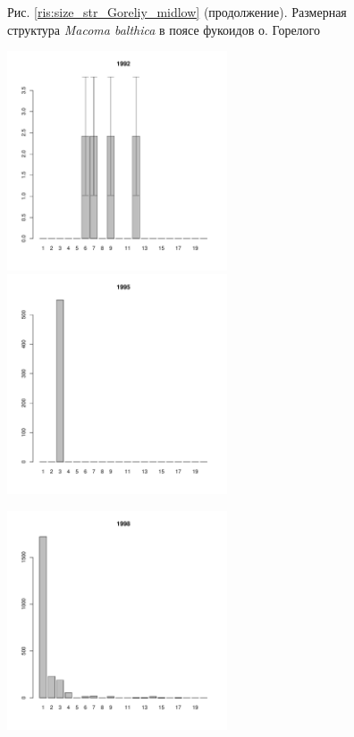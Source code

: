 \documentclass[12pt, a4paper]{article}
\begin{document}
\begin{figure}[h]


\begin{center}
Рис. \ref{ris:size_str_Goreliy_midlow} (продолжение). Размерная структура {\it Macoma balthica} в поясе фукоидов о. Горелого

\end{center}
\end{figure}





\begin{figure}[h]

\begin{multicols}{3}
\hfill
\includegraphics[width=65mm]{../White_Sea/Luvenga_Goreliy/low_1992_.pdf}
\hfill
\includegraphics[width=65mm]{../White_Sea/Luvenga_Goreliy/low_1995_.pdf}

\hfill
\includegraphics[width=65mm]{../White_Sea/Luvenga_Goreliy/low_1998_.pdf}


\end{multicols}
\end{figure}
\end{document}
